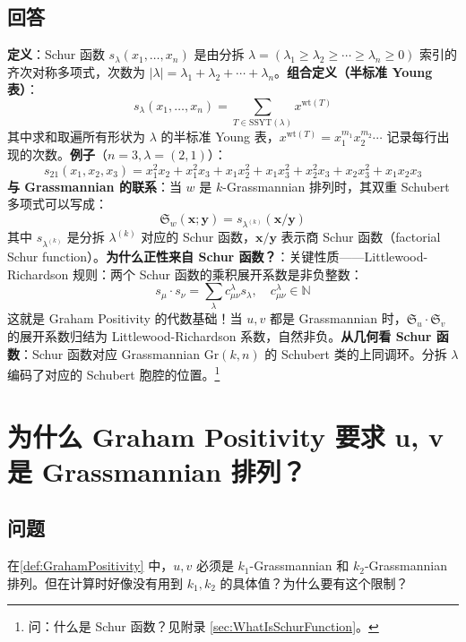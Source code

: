 \subsection{回答}
\textbf{定义}：Schur 函数 $s_\lambda(x_1, \ldots, x_n)$ 是由分拆 $\lambda = (\lambda_1 \geq \lambda_2 \geq \cdots \geq \lambda_n \geq 0)$ 索引的齐次对称多项式，次数为 $|\lambda| = \lambda_1 + \lambda_2 + \cdots + \lambda_n$。\textbf{组合定义（半标准 Young 表）}：$$s_\lambda(x_1, \ldots, x_n) = \sum_{T \in \mathrm{SSYT}(\lambda)} x^{\mathrm{wt}(T)}$$其中求和取遍所有形状为 $\lambda$ 的半标准 Young 表，$x^{\mathrm{wt}(T)} = x_1^{m_1} x_2^{m_2} \cdots$ 记录每行出现的次数。\textbf{例子}（$n=3, \lambda=(2,1)$）：$$s_{21}(x_1,x_2,x_3) = x_1^2 x_2 + x_1^2 x_3 + x_1 x_2^2 + x_1 x_3^2 + x_2^2 x_3 + x_2 x_3^2 + x_1 x_2 x_3$$\textbf{与 Grassmannian 的联系}：当 $w$ 是 $k$-Grassmannian 排列时，其双重 Schubert 多项式可以写成：$$\mathfrak{S}_w(\mathbf{x}; \mathbf{y}) = s_{\lambda^{(k)}}(\mathbf{x}/\mathbf{y})$$其中 $s_{\lambda^{(k)}}$ 是分拆 $\lambda^{(k)}$ 对应的 Schur 函数，$\mathbf{x}/\mathbf{y}$ 表示商 Schur 函数（factorial Schur function）。\textbf{为什么正性来自 Schur 函数？}：关键性质——Littlewood-Richardson 规则：两个 Schur 函数的乘积展开系数是非负整数：$$s_\mu \cdot s_\nu = \sum_\lambda c_{\mu\nu}^\lambda s_\lambda, \quad c_{\mu\nu}^\lambda \in \mathbb{N}$$这就是 Graham Positivity 的代数基础！当 $u, v$ 都是 Grassmannian 时，$\mathfrak{S}_u \cdot \mathfrak{S}_v$ 的展开系数归结为 Littlewood-Richardson 系数，自然非负。\textbf{从几何看 Schur 函数}：Schur 函数对应 Grassmannian $\mathrm{Gr}(k,n)$ 的 Schubert 类的上同调环。分拆 $\lambda$ 编码了对应的 Schubert 胞腔的位置。\footnote{问：什么是 Schur 函数？见附录 \cref{sec:WhatIsSchurFunction}。}
\section{为什么 Graham Positivity 要求 u, v 是 Grassmannian 排列？}\label{sec:WhyGrassmannian}
\subsection{问题}
在\cref{def:GrahamPositivity} 中，$u, v$ 必须是 $k_1$-Grassmannian 和 $k_2$-Grassmannian 排列。但在计算时好像没有用到 $k_1, k_2$ 的具体值？为什么要有这个限制？
